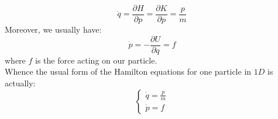         \begin{equation}
            \dot{q}=\frac{\partial H}{\partial p}=\frac{\partial K}{\partial p}=\frac{p}{m}
        \end{equation}
        Moreover, we usually have:
        \begin{equation}
            \dot{p}=-\frac{\partial U}{\partial q}=f
        \end{equation}
        where $f$ is the force acting on our particle.
        \\ Whence the usual form of the Hamilton equations for one particle in $1D$ is actually:
        \begin{equation}
        \begin{cases}
            \dot{q}=\frac{p}{m}\\
            \dot{p}=f
        \end{cases}
        \end{equation}
        
